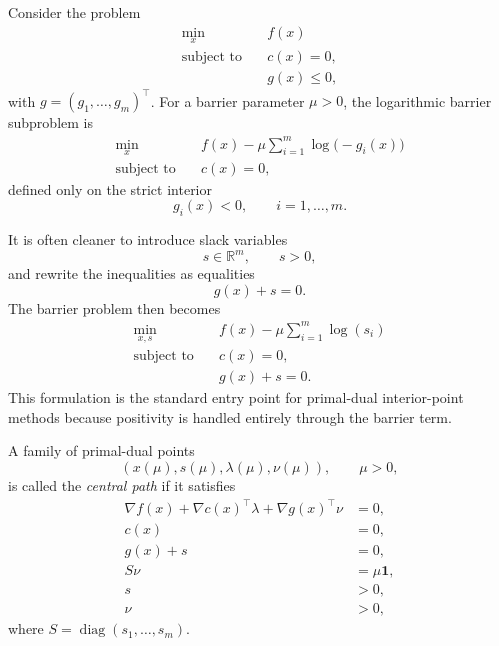 \begin{definition}\label{def:l3-logarithmic-barrier-formulation}
	Consider the problem
	\begin{align*}
		\min_x \quad & f(x) \\
		\text{subject to}\quad & c(x)=0, \\
		                       & g(x)\le 0,
	\end{align*}
	with $g=(g_1,\dots,g_m)^\top$. For a barrier parameter $\mu>0$, the logarithmic barrier subproblem is
	\begin{align*}
		\min_x \quad & f(x)-\mu\sum_{i=1}^{m}\log\bigl(-g_i(x)\bigr) \\
		\text{subject to}\quad & c(x)=0,
	\end{align*}
	defined only on the strict interior
	\[
		g_i(x)<0,
		\qquad i=1,\dots,m.
	\]
\end{definition}

\begin{remark}
	It is often cleaner to introduce slack variables
	\[
		s \in \mathbb{R}^{m},
		\qquad
		s>0,
	\]
	and rewrite the inequalities as equalities
	\[
		g(x)+s=0.
	\]
	The barrier problem then becomes
	\begin{align*}
		\min_{x,s} \quad & f(x)-\mu\sum_{i=1}^{m}\log(s_i) \\
		\text{subject to}\quad & c(x)=0, \\
		                       & g(x)+s=0.
	\end{align*}
	This formulation is the standard entry point for primal-dual interior-point methods because positivity is handled entirely through the barrier term.
\end{remark}

\begin{definition}\label{def:l3-central-path}
	A family of primal-dual points
	\[
		(x(\mu),s(\mu),\lambda(\mu),\nu(\mu)),
		\qquad
		\mu>0,
	\]
	is called the \emph{central path} if it satisfies
	\begin{align*}
		\nabla f(x)+\nabla c(x)^\top \lambda+\nabla g(x)^\top \nu & = 0, \\
		c(x) & = 0, \\
		g(x)+s & = 0, \\
		S\nu & = \mu \mathbf{1}, \\
		s & > 0, \\
		\nu & > 0,
	\end{align*}
	where $S=\operatorname{diag}(s_1,\dots,s_m)$.
\end{definition}

